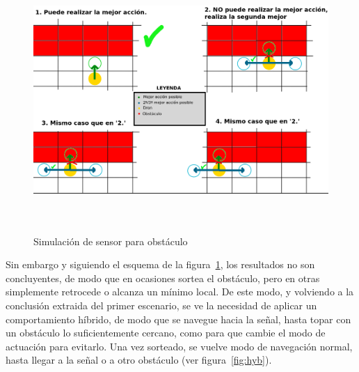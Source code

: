 \begin{figure} [tp]
    \begin{center}
    \includegraphics[height=10cm]{imagenes/cap4/28_pseudosensor.png}
    \end{center}
    \caption[Simulación de sensor para obstáculo]{Simulación de sensor para obstáculo}
    \label{fig:pseudosensor}
\end{figure}

Sin embargo y siguiendo el esquema de la figura~\ref{fig:pseudosensor}, los resultados no son concluyentes, de modo que en ocasiones sortea el obstáculo, pero en otras simplemente retrocede o alcanza un mínimo local. De este modo, y volviendo a la conclusión extraida del primer escenario, se ve la necesidad de aplicar un comportamiento híbrido, de modo que se navegue hacia la señal, hasta topar con un obstáculo lo suficientemente cercano, como para que cambie el modo de actuación para evitarlo. Una vez sorteado, se vuelve modo de navegación normal, hasta llegar a la señal o a otro obstáculo (ver figura~\ref{fig:hyb}).\\

